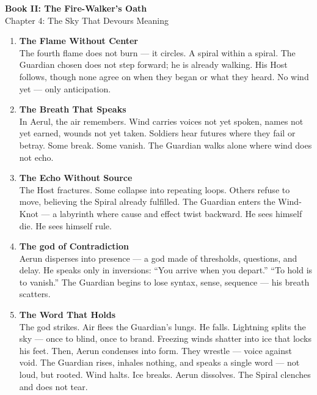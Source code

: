 \documentclass[9pt]{article}
\begin{document}
\begin{center}
    \Large\textbf{Book II: The Fire-Walker's Oath} \\
    \large Chapter 4: The Sky That Devours Meaning \\
\end{center}

\vspace{1in}


\begin{center}
\begin{enumerate}
    \item \textbf{The Flame Without Center} \\
    The fourth flame does not burn — it circles. A spiral within a spiral. The Guardian chosen does not step forward; he is already walking. His Host follows, though none agree on when they began or what they heard. No wind yet — only anticipation.

    \vspace{.3in}
    \item \textbf{The Breath That Speaks} \\
    In Aerul, the air remembers. Wind carries voices not yet spoken, names not yet earned, wounds not yet taken. Soldiers hear futures where they fail or betray. Some break. Some vanish. The Guardian walks alone where wind does not echo.

    \vspace{.3in}
    \item \textbf{The Echo Without Source} \\
    The Host fractures. Some collapse into repeating loops. Others refuse to move, believing the Spiral already fulfilled. The Guardian enters the Wind-Knot — a labyrinth where cause and effect twist backward. He sees himself die. He sees himself rule.

    \vspace{.3in}
    \item \textbf{The god of Contradiction} \\
    Aerun disperses into presence — a god made of thresholds, questions, and delay. He speaks only in inversions: “You arrive when you depart.” “To hold is to vanish.” The Guardian begins to lose syntax, sense, sequence — his breath scatters.

    \vspace{.3in}
    \item \textbf{The Word That Holds} \\
    The god strikes. Air flees the Guardian’s lungs. He falls. Lightning splits the sky — once to blind, once to brand. Freezing winds shatter into ice that locks his feet. Then, Aerun condenses into form. They wrestle — voice against void. The Guardian rises, inhales nothing, and speaks a single word — not loud, but rooted. Wind halts. Ice breaks. Aerun dissolves. The Spiral clenches and does not tear.


\end{enumerate}
\end{center}
\end{document}
